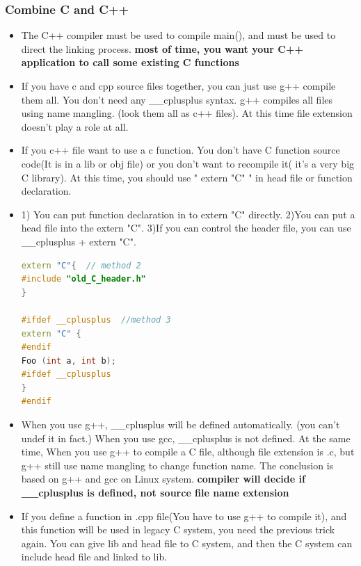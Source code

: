 \documentclass[a4paper,12pt,twoside]{book}
\begin{document}
\subsubsection{Combine C and C++}
\begin{itemize}
    \item The C++ compiler must be used to compile main(), and must be used to direct the linking process. \textbf{most of time, you want your C++ application to call some existing C functions}
    
    \item If you have c and cpp source files together, you can just use g++ compile them all. You don't need any \_\_cplusplus syntax.  g++ compiles all files using name mangling. (look them all as c++ files). At this time file extension doesn't play a role at all.
    
    \item If you c++ file want to use a c function. You don't have C function source code(It is in a lib or obj file) or you don't want to recompile it( it's a very big C library). At this time, you should use " extern "C" " in head file or function declaration.
    
    \item 1) You can put function declaration in to extern "C" directly. 2)You can put a head file into the extern "C". 3)If you can control the header file, you can use \_\_cplusplus + extern "C".
    
\begin{lstlisting}[frame=single, language=c++]
extern "C"{  // method 2
#include "old_C_header.h"
}

#ifdef __cplusplus  //method 3
extern "C" {
#endif
Foo (int a, int b);
#ifdef __cplusplus
}
#endif
\end{lstlisting}
    
    \item When you use g++,  \_\_cplusplus will be defined automatically. (you can't undef it in fact.) When you use gcc, \_\_cplusplus is not defined. At the same time, When you use g++ to compile a C file, although file extension is .c, but g++ still use name mangling to change function name.  The conclusion is based on g++ and gcc on Linux system. \textbf{compiler will decide if \_\_cplusplus is defined, not source file name extension}
    
    
    \item If you define a function in .cpp file(You have to use g++ to compile it), and this function will be used in legacy C system, you need the previous trick again.  You can give lib and head file to C system,  and then the C system can include head file and linked to lib.
    

\end{itemize}
\end{document}
